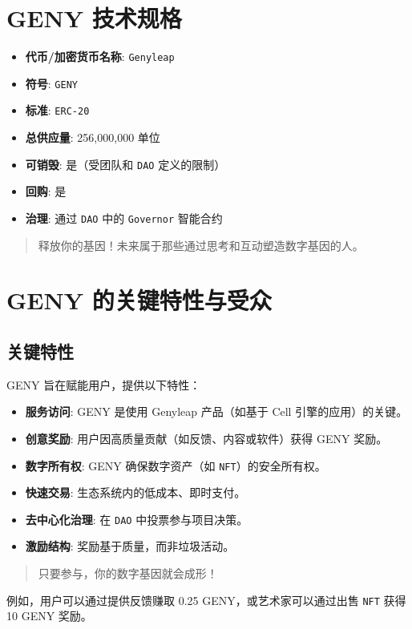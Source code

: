 \documentclass[a4paper,12pt,openany]{book}
\begin{document}
\section*{GENY 技术规格}
\begin{itemize}
    \item \textbf{代币/加密货币名称}: \texttt{Genyleap}
    \item \textbf{符号}: \texttt{GENY}
    \item \textbf{标准}: \texttt{ERC-20}
    \item \textbf{总供应量}: 256,000,000 单位
    \item \textbf{可销毁}: 是（受团队和 \texttt{DAO} 定义的限制）
    \item \textbf{回购}: 是
    \item \textbf{治理}: 通过 \texttt{DAO} 中的 \texttt{Governor} 智能合约
\end{itemize}
\vspace{-0.5em}
\begin{quote}
释放你的基因！未来属于那些通过思考和互动塑造数字基因的人。
\end{quote}
\newpage

\section*{GENY 的关键特性与受众}
\subsection*{关键特性}
GENY 旨在赋能用户，提供以下特性：
\begin{itemize}
    \item \textbf{服务访问}: GENY 是使用 Genyleap 产品（如基于 Cell 引擎的应用）的关键。
    \item \textbf{创意奖励}: 用户因高质量贡献（如反馈、内容或软件）获得 GENY 奖励。
    \item \textbf{数字所有权}: GENY 确保数字资产（如 \texttt{NFT}）的安全所有权。
    \item \textbf{快速交易}: 生态系统内的低成本、即时支付。
    \item \textbf{去中心化治理}: 在 \texttt{DAO} 中投票参与项目决策。
    \item \textbf{激励结构}: 奖励基于质量，而非垃圾活动。
\end{itemize}
\begin{quote}
只要参与，你的数字基因就会成形！
\end{quote}
例如，用户可以通过提供反馈赚取 0.25 GENY，或艺术家可以通过出售 \texttt{NFT} 获得 10 GENY 奖励。
\end{document}
